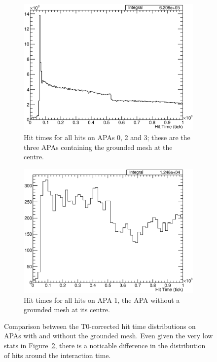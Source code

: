 \begin{figure}
  \centering
  \begin{subfigure}[t]{0.48\linewidth}
    \centering
    \includegraphics[width=\textwidth]{HitTimesAPA023.eps}
    \caption{Hit times for all hits on APAs 0, 2 and 3; these are the three APAs containing the grounded mesh at the centre.}
    \label{fig:HitTimesAPA023}
  \end{subfigure}
  \hfill
  \begin{subfigure}[t]{0.48\linewidth}
    \centering
    \includegraphics[width=\textwidth]{HitTimesAPA1.eps}
    \caption{Hit times for all hits on APA 1, the APA without a grounded mesh at its centre.}
    \label{fig:HitTimesAPA1}
  \end{subfigure}
  \caption[Comparison between the T0-corrected hit time distributions on APAs with and without the grounded mesh.]{Comparison between the T0-corrected hit time distributions on APAs with and without the grounded mesh.  Even given the very low stats in Figure~\ref{fig:HitTimesAPA1}, there is a noticable difference in the distribution of hits around the interaction time.}
  \label{fig:HitTimesAPAs}
\end{figure}

